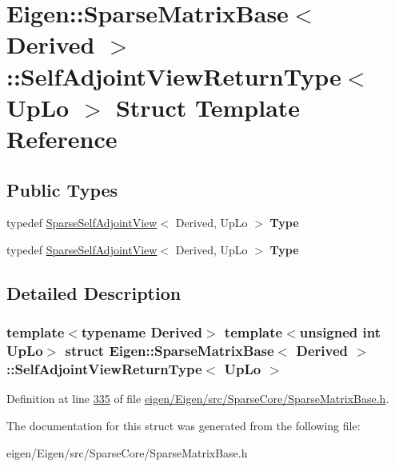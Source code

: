\hypertarget{struct_eigen_1_1_sparse_matrix_base_1_1_self_adjoint_view_return_type}{}\section{Eigen\+:\+:Sparse\+Matrix\+Base$<$ Derived $>$\+:\+:Self\+Adjoint\+View\+Return\+Type$<$ Up\+Lo $>$ Struct Template Reference}
\label{struct_eigen_1_1_sparse_matrix_base_1_1_self_adjoint_view_return_type}
\subsection*{Public Types}
\begin{DoxyCompactItemize}
\item 
\mbox{\label{struct_eigen_1_1_sparse_matrix_base_1_1_self_adjoint_view_return_type_ae7adbe6e76b775017b2177ecccde88f8}} 
typedef \hyperlink{group___sparse_core___module_class_eigen_1_1_sparse_self_adjoint_view}{Sparse\+Self\+Adjoint\+View}$<$ Derived, Up\+Lo $>$ {\bfseries Type}
\item 
\mbox{\label{struct_eigen_1_1_sparse_matrix_base_1_1_self_adjoint_view_return_type_ae7adbe6e76b775017b2177ecccde88f8}} 
typedef \hyperlink{group___sparse_core___module_class_eigen_1_1_sparse_self_adjoint_view}{Sparse\+Self\+Adjoint\+View}$<$ Derived, Up\+Lo $>$ {\bfseries Type}
\end{DoxyCompactItemize}


\subsection{Detailed Description}
\subsubsection*{template$<$typename Derived$>$\newline
template$<$unsigned int Up\+Lo$>$\newline
struct Eigen\+::\+Sparse\+Matrix\+Base$<$ Derived $>$\+::\+Self\+Adjoint\+View\+Return\+Type$<$ Up\+Lo $>$}



Definition at line \hyperlink{eigen_2_eigen_2src_2_sparse_core_2_sparse_matrix_base_8h_source_l00335}{335} of file \hyperlink{eigen_2_eigen_2src_2_sparse_core_2_sparse_matrix_base_8h_source}{eigen/\+Eigen/src/\+Sparse\+Core/\+Sparse\+Matrix\+Base.\+h}.



The documentation for this struct was generated from the following file\+:\begin{DoxyCompactItemize}
\item 
eigen/\+Eigen/src/\+Sparse\+Core/\+Sparse\+Matrix\+Base.\+h\end{DoxyCompactItemize}
